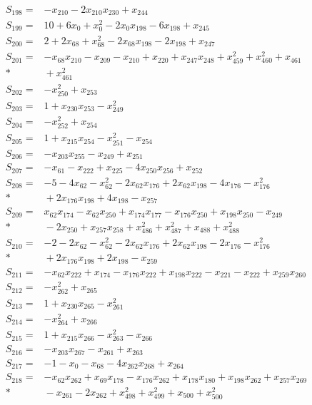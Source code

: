 \begin{align*}
S_{198}={}&-x_{210}-2x_{210}x_{230}+x_{244}\\[3pt]
S_{199}={}&10+6x_{0}+x_{0}^{2}-2x_{0}x_{198}-6x_{198}+x_{245}\\[3pt]
S_{200}={}&2+2x_{68}+x_{68}^{2}-2x_{68}x_{198}-2x_{198}+x_{247}\\[3pt]
S_{201}={}&-x_{68}x_{210}-x_{209}-x_{210}+x_{220}+x_{247}x_{248}+x_{459}^{2}+x_{460}^{2}+x_{461}\\*
&{}+x_{461}^{2}\\[3pt]
S_{202}={}&-x_{250}^{2}+x_{253}\\[3pt]
S_{203}={}&1+x_{230}x_{253}-x_{249}^{2}\\[3pt]
S_{204}={}&-x_{252}^{2}+x_{254}\\[3pt]
S_{205}={}&1+x_{215}x_{254}-x_{251}^{2}-x_{254}\\[3pt]
S_{206}={}&-x_{203}x_{255}-x_{249}+x_{251}\\[3pt]
S_{207}={}&-x_{61}-x_{222}+x_{225}-4x_{250}x_{256}+x_{252}\\[3pt]
S_{208}={}&-5-4x_{62}-x_{62}^{2}-2x_{62}x_{176}+2x_{62}x_{198}-4x_{176}-x_{176}^{2}\\*
&{}+2x_{176}x_{198}+4x_{198}-x_{257}\\[3pt]
S_{209}={}&x_{62}x_{174}-x_{62}x_{250}+x_{174}x_{177}-x_{176}x_{250}+x_{198}x_{250}-x_{249}\\*
&{}-2x_{250}+x_{257}x_{258}+x_{486}^{2}+x_{487}^{2}+x_{488}+x_{488}^{2}\\[3pt]
S_{210}={}&-2-2x_{62}-x_{62}^{2}-2x_{62}x_{176}+2x_{62}x_{198}-2x_{176}-x_{176}^{2}\\*
&{}+2x_{176}x_{198}+2x_{198}-x_{259}\\[3pt]
S_{211}={}&-x_{62}x_{222}+x_{174}-x_{176}x_{222}+x_{198}x_{222}-x_{221}-x_{222}+x_{259}x_{260}\\[3pt]
S_{212}={}&-x_{262}^{2}+x_{265}\\[3pt]
S_{213}={}&1+x_{230}x_{265}-x_{261}^{2}\\[3pt]
S_{214}={}&-x_{264}^{2}+x_{266}\\[3pt]
S_{215}={}&1+x_{215}x_{266}-x_{263}^{2}-x_{266}\\[3pt]
S_{216}={}&-x_{203}x_{267}-x_{261}+x_{263}\\[3pt]
S_{217}={}&-1-x_{0}-x_{68}-4x_{262}x_{268}+x_{264}\\[3pt]
S_{218}={}&-x_{62}x_{262}+x_{69}x_{178}-x_{176}x_{262}+x_{178}x_{180}+x_{198}x_{262}+x_{257}x_{269}\\*
&{}-x_{261}-2x_{262}+x_{498}^{2}+x_{499}^{2}+x_{500}+x_{500}^{2}\\[3pt]

\end{align*}
